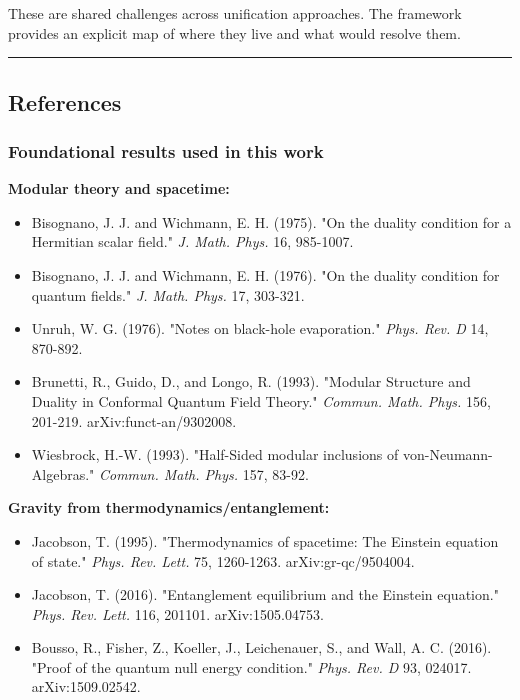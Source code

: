 These are shared challenges across unification approaches. The framework provides an explicit map of where they live and what would resolve them.

\begin{center}\rule{0.5\linewidth}{0.5pt}\end{center}

\ifdefined\OPHSkipEmbeddedReferences
\else
\subsection{References}\label{references-paper}

\subsubsection{Foundational results used in this work}\label{foundational-results-used-in-this-work}

\textbf{Modular theory and spacetime:}

\begin{itemize}
\tightlist
\item
  Bisognano, J. J. and Wichmann, E. H. (1975). "On the duality condition for a Hermitian scalar field." \emph{J. Math. Phys.} 16, 985-1007.
\item
  Bisognano, J. J. and Wichmann, E. H. (1976). "On the duality condition for quantum fields." \emph{J. Math. Phys.} 17, 303-321.
\item
  Unruh, W. G. (1976). "Notes on black-hole evaporation." \emph{Phys. Rev. D} 14, 870-892.
\item
  Brunetti, R., Guido, D., and Longo, R. (1993). "Modular Structure and Duality in Conformal Quantum Field Theory." \emph{Commun. Math. Phys.} 156, 201-219. arXiv:funct-an/9302008.
\item
  Wiesbrock, H.-W. (1993). "Half-Sided modular inclusions of von-Neumann-Algebras." \emph{Commun. Math. Phys.} 157, 83-92.
\end{itemize}

\textbf{Gravity from thermodynamics/entanglement:}

\begin{itemize}
\tightlist
\item
  Jacobson, T. (1995). "Thermodynamics of spacetime: The Einstein equation of state." \emph{Phys. Rev. Lett.} 75, 1260-1263. arXiv:gr-qc/9504004.
\item
  Jacobson, T. (2016). "Entanglement equilibrium and the Einstein equation." \emph{Phys. Rev. Lett.} 116, 201101. arXiv:1505.04753.
\item
  Bousso, R., Fisher, Z., Koeller, J., Leichenauer, S., and Wall, A. C. (2016). "Proof of the quantum null energy condition." \emph{Phys. Rev. D} 93, 024017. arXiv:1509.02542.
\end{itemize}

